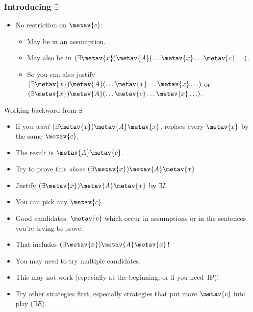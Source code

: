 \begin{frame}
  \frametitle{Introducing $\exists$}

  \begin{fitchproof}
  \end{fitchproof}
  \begin{itemize}[<+->]
    \item No restriction on $\metav{c}$:
    \begin{itemize}[<+->]
      \item May be in an assumption.
      \item May also be in $\qt{\exists}{\metav{x}}\metav{A}(\ldots \metav{x}
      \ldots \metav{c}\ldots)$.
      \item So you can also justify $\qt{\exists}{\metav{x}}\metav{A}(\ldots \metav{x}
      \ldots \metav{x}\ldots)$ or $\qt{\exists}{\metav{x}}\metav{A}(\ldots \metav{c}
      \ldots \metav{x}\ldots)$.
    \end{itemize}
  \end{itemize}
\end{frame}

\begin{frame}{Working backward from $\exists$}

  \begin{itemize}[<+->]
    \item If you \emph{want} $\qt{\exists}{\metav{x}}\metav{A}\qv{\metav{x}}$, replace every $\metav{x}$ by the
      same $\metav{c}$.
    \item The result is $\metav{A}\qv{\metav{c}}$. 
    \item Try to prove this \emph{above} $\qt{\exists}{\metav{x}}\metav{A}\qv{\metav{x}}$
    \item Justify $\qt{\exists}{\metav{x}}\metav{A}\qv{\metav{x}}$ by $\exists I$.
    \item You can pick any $\metav{c}$.
    \item Good candidates: $\metav{c}$ which occur in assumptions or
      in the sentences you're trying to prove.
    \item That includes $\qt{\exists}{\metav{x}}\metav{A}\qv{\metav{x}}$!
    \item You may need to try multiple candidates.
    \item This may not work (especially at the beginning, or if
    you need~IP)!
    \item Try other strategies first, especially strategies that put
    more $\metav{c}$ into play ($\exists E$).
    \end{itemize}
\end{frame}

